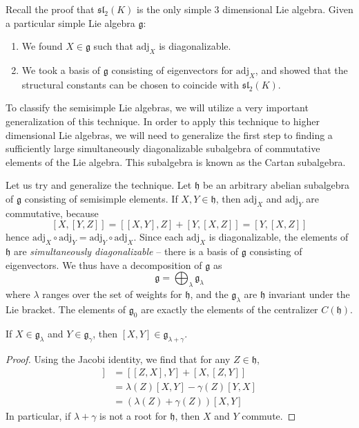 Recall the proof that $\mathfrak{sl}_2(K)$ is the only simple 3 dimensional Lie algebra. Given a particular simple Lie algebra $\mathfrak{g}$:
%
\begin{enumerate}
    \item We found $X \in \mathfrak{g}$ such that $\text{adj}_X$ is diagonalizable.
    \item We took a basis of $\mathfrak{g}$ consisting of eigenvectors for $\text{adj}_X$, and showed that the structural constants can be chosen to coincide with $\mathfrak{sl}_2(K)$.
\end{enumerate}
%
To classify the semisimple Lie algebras, we will utilize a very important generalization of this technique. In order to apply this technique to higher dimensional Lie algebras, we will need to generalize the first step to finding a sufficiently large simultaneously diagonalizable subalgebra of commutative elements of the Lie algebra. This subalgebra is known as the Cartan subalgebra.

Let us try and generalize the technique. Let $\mathfrak{h}$ be an arbitrary abelian subalgebra of $\mathfrak{g}$ consisting of semisimple elements. If $X, Y \in \mathfrak{h}$, then $\text{adj}_X$ and $\text{adj}_Y$ are commutative, because
%
\[ [X,[Y,Z]] = [[X,Y],Z] + [Y,[X,Z]] = [Y,[X,Z]] \]
%
hence $\text{adj}_X \circ \text{adj}_Y = \text{adj}_Y \circ \text{adj}_X$. Since each $\text{adj}_X$ is diagonalizable, the elements of $\mathfrak{h}$ are {\it simultaneously diagonalizable} -- there is a basis of $\mathfrak{g}$ consisting of eigenvectors. We thus have a decomposition of $\mathfrak{g}$ as
%
\[ \mathfrak{g} = \bigoplus_{\lambda} \mathfrak{g}_\lambda \]
%
where $\lambda$ ranges over the set of weights for $\mathfrak{h}$, and the $\mathfrak{g}_\lambda$ are $\mathfrak{h}$ invariant under the Lie bracket. The elements of $\mathfrak{g}_0$ are exactly the elements of the centralizer $C(\mathfrak{h})$.

\begin{theorem}
    If $X \in \mathfrak{g}_\lambda$ and $Y \in \mathfrak{g}_\gamma$, then $[X,Y] \in \mathfrak{g}_{\lambda + \gamma}$.
\end{theorem}
\begin{proof}
    Using the Jacobi identity, we find that for any $Z \in \mathfrak{h}$,
    \begin{align*}
        [Z,[X,Y]] &= [[Z,X],Y] + [X,[Z,Y]]\\
        &= \lambda(Z)[X,Y] - \gamma(Z)[Y,X]\\
        &= (\lambda(Z) + \gamma(Z))[X,Y]
    \end{align*}
    In particular, if $\lambda + \gamma$ is not a root for $\mathfrak{h}$, then $X$ and $Y$ commute.
\end{proof}

